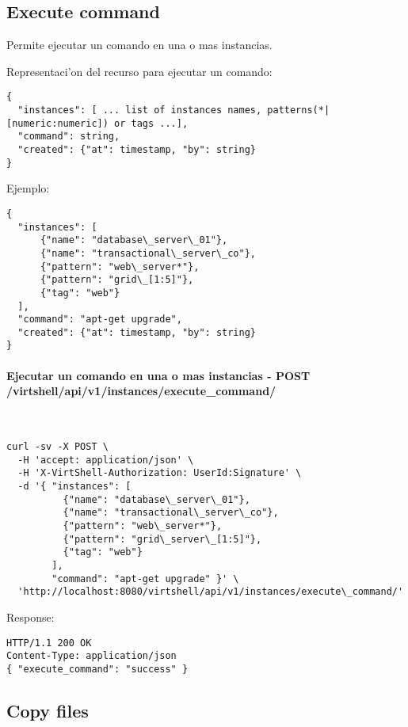 \subsection{Execute command}

Permite ejecutar un comando en una o mas instancias.

Representaci'on del recurso para ejecutar un comando:

\medskip
\begin{lstlisting}[style=json]
{
  "instances": [ ... list of instances names, patterns(*|[numeric:numeric]) or tags ...],
  "command": string,
  "created": {"at": timestamp, "by": string}
}
\end{lstlisting}

Ejemplo:

\medskip
\begin{lstlisting}[style=json]
{
  "instances": [
      {"name": "database\_server\_01"},
      {"name": "transactional\_server\_co"},      
      {"pattern": "web\_server*"},
      {"pattern": "grid\_[1:5]"},
      {"tag": "web"}
  ],
  "command": "apt-get upgrade",
  "created": {"at": timestamp, "by": string}
}
\end{lstlisting}

\paragraph{Ejecutar un comando en una o mas instancias - POST /virtshell/api/v1/instances/execute\_command/} ~\\

\begin{lstlisting}[style=json]
curl -sv -X POST \
  -H 'accept: application/json' \
  -H 'X-VirtShell-Authorization: UserId:Signature' \
  -d '{ "instances": [
          {"name": "database\_server\_01"},
          {"name": "transactional\_server\_co"},          
          {"pattern": "web\_server*"},
          {"pattern": "grid\_server\_[1:5]"},
          {"tag": "web"}
        ],
        "command": "apt-get upgrade" }' \
  'http://localhost:8080/virtshell/api/v1/instances/execute\_command/'
\end{lstlisting}

Response:

\begin{lstlisting}[style=json]
HTTP/1.1 200 OK
Content-Type: application/json
{ "execute_command": "success" }
\end{lstlisting}


\subsection{Copy files}

